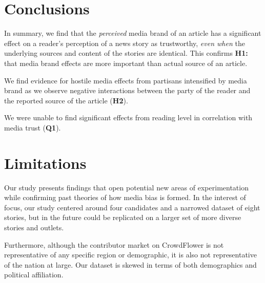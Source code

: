 \section{Conclusions}
In summary, we find that the \emph{perceived} media brand of an article has a significant effect on a reader's perception of a news story as trustworthy, \emph{even when} the underlying sources and content of the stories are identical. This confirms \textbf{H1:} that media brand effects are more important than actual source of an article. 

We find evidence for hostile media effects from partisans intensified by media brand as we observe negative interactions between the party of the reader and the reported source of the article (\textbf{H2}).

We were unable to find significant effects from reading level in correlation with media trust (\textbf{Q1}).


\section{Limitations}

Our study presents findings that open potential new areas of experimentation while confirming past theories of how media bias is formed. In the interest of focus, our study centered around four candidates and a narrowed dataset of eight stories, but in the future could be replicated on a larger set of more diverse stories and outlets. 

Furthermore, although the contributor market on CrowdFlower is not representative of any specific region or demographic, it is also not representative of the nation at large. Our dataset is skewed in terms of both demographics and political affiliation.


